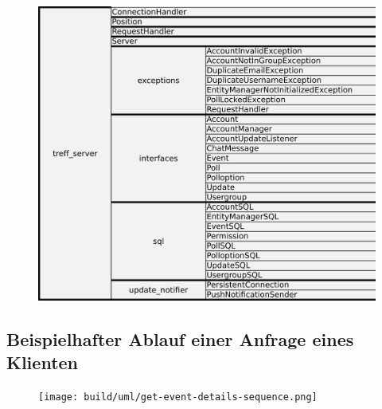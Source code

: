 \documentclass[parskip=full,11pt]{scrartcl}
\begin{document}
\begin{figure}[!htb]
	\centering
	\includegraphics[width = \columnwidth / 100 * 90]{treff3.png}
	\label{fig:classesserver}
\end{figure}


\pagebreak
\subsection{Beispielhafter Ablauf einer Anfrage eines Klienten}

\begin{figure}[!htb]
    \centering
    \texttt{[image: build/uml/get-event-details-sequence.png]}
	\label{fig:sequence-diagram}
\end{figure}


\pagebreak
\end{document}

